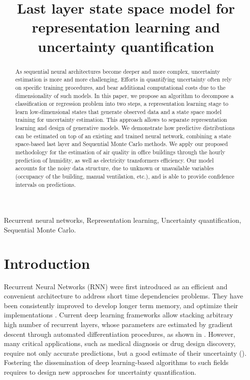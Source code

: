 \documentclass{article}
\title{Last layer state space model for representation learning and uncertainty quantification}
\begin{document}
\maketitle

\begin{abstract}
	As sequential neural architectures become deeper and more complex, uncertainty estimation is more and more challenging.
	Efforts in quantifying uncertainty often rely on specific training procedures, and bear additional computational costs due to the dimensionality of such models. In this paper, we propose an algorithm to decompose a classification or regression problem into two steps,  a representation learning stage to learn low-dimensional states that generate observed data and a state space model training for uncertainty estimation. This approach allows to separate representation learning and design of generative models. We demonstrate how predictive distributions can be estimated on top of an existing and trained neural network, combining a state space-based last layer and Sequential Monte Carlo methods.  We apply our proposed methodology for the estimation of air quality in office buildings through the hourly prediction of humidity, as well as electricity transformers efficiency.
	Our model accounts for the noisy data structure, due to unknown or unavailable variables (occupancy of the building, manual ventilation, etc.), and is able to provide confidence intervals on predictions.
\end{abstract}

\begin{keywords}
	Recurrent neural networks, Representation learning, Uncertainty quantification, Sequential Monte Carlo.
\end{keywords}

\section{Introduction}
\label{sec:intro}

Recurrent Neural Networks (RNN) were first introduced as an efficient and convenient architecture to address short time dependencies problems.
They have been consistently improved to develop longer term memory, and optimize their implementations \cite{Bengio1994LearningLD,Hochreiter1997LongSM}. %
Current deep learning frameworks allow stacking arbitrary high number of recurrent layers, whose parameters are estimated by gradient descent through automated differentiation procedures, as shown in \cite{Graves2013SpeechRecognition}.
However, many critical applications, such as medical diagnosis or drug design discovery, require not only accurate predictions, but a good estimate of their uncertainty (\cite{Crowson2016AssessingCalibration, Mervin2020UncertaintyQuantification}).
Fostering the dissemination of deep learning-based algorithms to such fields requires to design new approaches for uncertainty quantification.
\end{document}
